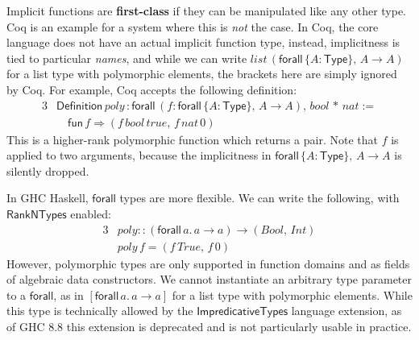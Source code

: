 \documentclass[acmsmall,review,anonymous,prologue,dvipsnames]{acmart}\settopmatter{printfolios=true,printccs=false,printacmref=false}
\newcommand{\kw}[1]{{\mathsf{#1}}}
\theoremstyle{remark}
\begin{document}
Implicit functions are \textbf{first-class} if they can be manipulated like any
other type. Coq is an example for a system where this is \emph{not} the case.
In Coq, the core language does not have an actual implicit function type,
instead, implicitness is tied to particular \emph{names}, and while we can write
$list\,(\kw{forall}\,\{A : \kw{Type}\},\,A\to A)$ for a list type with
polymorphic elements, the brackets here are simply ignored by Coq. For example,
Coq accepts the following definition:
\begin{alignat*}{3}
  & \kw{Definition}\,poly\,: \kw{forall}\,(f : \kw{forall}\,\{A : \kw{Type}\},\,A\to A),\,bool\,*\,nat :=\\
  & \quad \kw{fun}\,f \Rightarrow (f\,bool\,true,\,f\,nat\,0)
\end{alignat*}
This is a higher-rank polymorphic function which returns a pair. Note that $f$
is applied to two arguments, because the implicitness in $\kw{forall}\,\{A :
\kw{Type}\},\,A\to A$ is silently dropped.

In GHC Haskell, $\kw{forall}$ types are more flexible. We can write the
following, with $\kw{RankNTypes}$ enabled:
\begin{alignat*}{3}
  & poly :: (\kw{forall}\,a.\,a \to a) \to (Bool,\,Int) \\
  & poly\,f = (f\,True,\,f\,0)
\end{alignat*}
However, polymorphic types are only supported in function domains and as fields
of algebraic data constructors. We cannot instantiate an arbitrary type
parameter to a $\kw{forall}$, as in $[\kw{forall}\,a.\,a\to a]$ for a list type
with polymorphic elements. While this type is technically allowed by the
$\kw{ImpredicativeTypes}$ language extension, as of GHC 8.8 this extension is
deprecated and is not particularly usable in practice.
\end{document}

